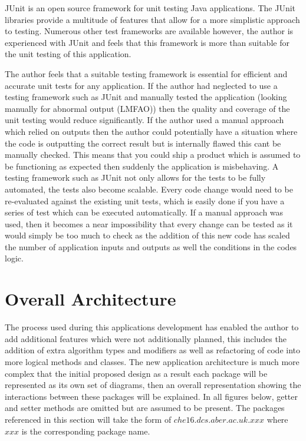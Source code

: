 JUnit is an open source framework for unit testing Java applications. The JUnit libraries provide a multitude of features that allow for a more simplistic approach to testing. Numerous other test frameworks are available however, the author is experienced with JUnit and feels that this framework is more than suitable for the unit testing of this application.

The author feels that a suitable testing framework is essential for efficient and accurate unit tests for any application. If the author had neglected to use a testing framework such as JUnit and manually tested the application (looking manually for abnormal output (LMFAO)) then the quality and coverage of the unit testing would reduce significantly. If the author used a manual approach which relied on outputs then the author could potentially have a situation where the code is outputting the correct result but is internally flawed this cant be manually checked. This means that you could ship a product which is assumed to be functioning as expected then suddenly the application is misbehaving. A testing framework such as JUnit not only allows for the tests to be fully automated, the tests also become scalable. Every code change would need to be re-evaluated against the existing unit tests, which is easily done if you have a series of test which can be executed automatically. If a manual approach was used, then it becomes a near impossibility that every change can be tested as it would simply be too much to check as the addition of this new code has scaled the number of application inputs and outputs as well the conditions in the codes logic.

\section{Overall Architecture}

The process used during this applications development has enabled the author to add additional features which were not additionally planned, this includes the addition of extra algorithm types and modifiers as well as refactoring of code into more logical methods and classes. The new application architecture is much more complex that the initial proposed design as a result each package will be represented as its own set of diagrams, then an overall representation showing the interactions between these packages will be explained. In all figures below, getter and setter methods are omitted but are assumed to be present. The packages referenced in this section will take the form of $che16.dcs.aber.ac.uk.xxx$ where $xxx$ is the corresponding package name.

